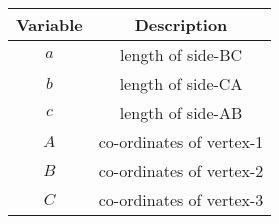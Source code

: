 \begin{tabular}[12pt]{ |c| c|}
    \hline
    \textbf{Variable} & \textbf{Description}\\ 
    \hline
    $a$ & length of side-BC \\
    \hline 
    $b$ & length of side-CA \\
    \hline
    $c$ & length of side-AB \\
    \hline
    $A$ & co-ordinates of vertex-1 \\
    \hline
    $B$ & co-ordinates of vertex-2 \\
    \hline
    $C$ & co-ordinates of vertex-3 \\
    \hline
    \end{tabular}